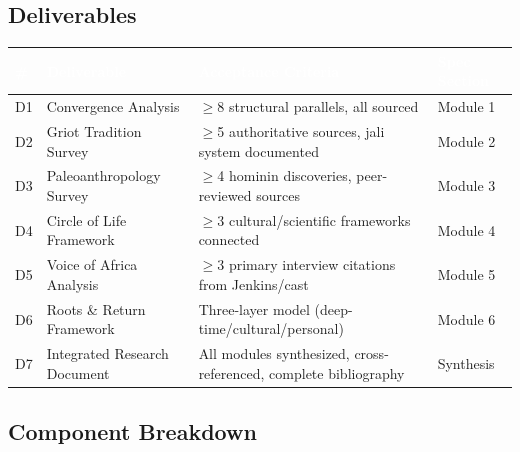 \documentclass[11pt,letterpaper]{article}
\newcommand{\tableheader}[1]{\textbf{\sffamily\textcolor{white}{#1}}}
\begin{document}
\subsection{Deliverables}

\begin{center}
\begin{tabularx}{\textwidth}{C{0.8cm}L{3.5cm}XL{2.5cm}}
\toprule
{}
\tableheader{\#} & \tableheader{Deliverable} & \tableheader{Acceptance Criteria} & \tableheader{Spec Section} \\
\midrule
D1 & Convergence Analysis & $\geq$8 structural parallels, all sourced & Module 1 \\
D2 & Griot Tradition Survey & $\geq$5 authoritative sources, jali system documented & Module 2 \\
D3 & Paleoanthropology Survey & $\geq$4 hominin discoveries, peer-reviewed sources & Module 3 \\
D4 & Circle of Life Framework & $\geq$3 cultural/scientific frameworks connected & Module 4 \\
D5 & Voice of Africa Analysis & $\geq$3 primary interview citations from Jenkins/cast & Module 5 \\
D6 & Roots \& Return Framework & Three-layer model (deep-time/cultural/personal) & Module 6 \\
D7 & Integrated Research Document & All modules synthesized, cross-referenced, complete bibliography & Synthesis \\
\bottomrule
\end{tabularx}
\end{center}

\subsection{Component Breakdown}
\end{document}
